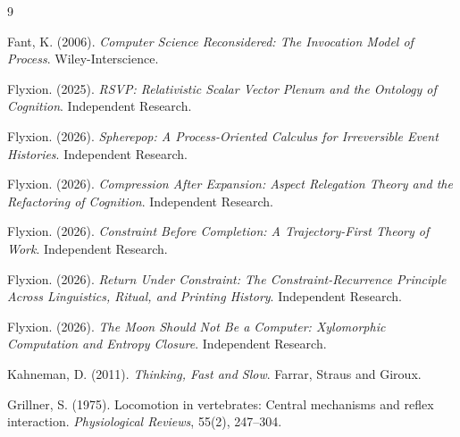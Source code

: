\documentclass[11pt,oneside]{book}
\begin{document}
\begin{thebibliography}{9}

Fant, K. (2006). \textit{Computer Science Reconsidered: The Invocation Model of Process}. Wiley-Interscience.

Flyxion. (2025). \textit{RSVP: Relativistic Scalar Vector Plenum and the Ontology of Cognition}. Independent Research.

Flyxion. (2026). \textit{Spherepop: A Process-Oriented Calculus for Irreversible Event Histories}. Independent Research.

Flyxion. (2026). \textit{Compression After Expansion: Aspect Relegation Theory and the Refactoring of Cognition}. Independent Research.

Flyxion. (2026). \textit{Constraint Before Completion: A Trajectory-First Theory of Work}. Independent Research.

Flyxion. (2026). \textit{Return Under Constraint: The Constraint-Recurrence Principle Across Linguistics, Ritual, and Printing History}. Independent Research.

Flyxion. (2026). \textit{The Moon Should Not Be a Computer: Xylomorphic Computation and Entropy Closure}. Independent Research.

Kahneman, D. (2011). \textit{Thinking, Fast and Slow}. Farrar, Straus and Giroux.

Grillner, S. (1975). Locomotion in vertebrates: Central mechanisms and reflex interaction. \textit{Physiological Reviews}, 55(2), 247--304.

\end{thebibliography}
\end{document}
